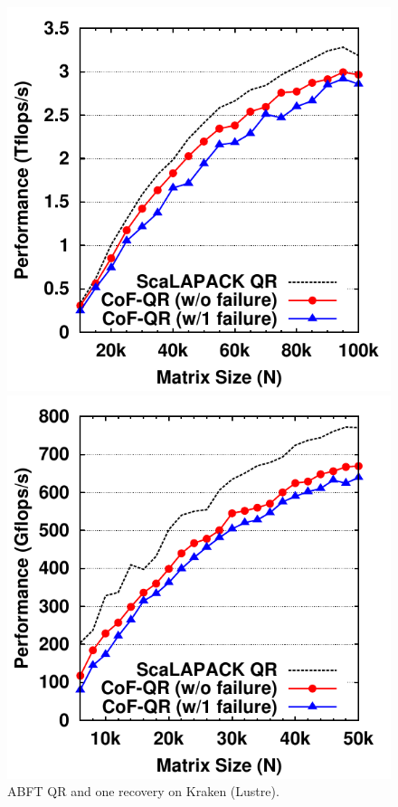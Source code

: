 \begin{figure}[thb]
\centering
\begin{minipage}[t]{.29\linewidth}
	\includegraphics[width=\linewidth]{figures/kraken_new_data}
	\vspace{-.6cm}\caption{ABFT QR and one \cof recovery on Kraken (Lustre).}%
	\label{fig:kraken_performance}	
\end{minipage}
\hfill
\begin{minipage}[t]{.29\linewidth}
    \includegraphics[width=\linewidth]{figures/dancer_performance_data}

\end{minipage}
\end{figure}
